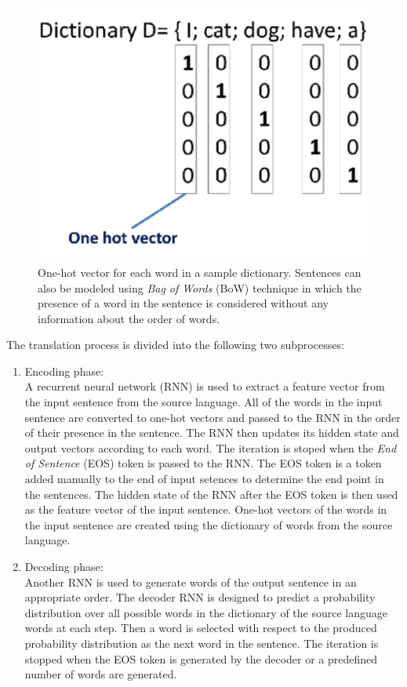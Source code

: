 \documentclass[preprint, 12pt]{elsarticle}
\begin{document}
		\begin{figure}[h]
			\centering
			\includegraphics[scale=0.5]{Imgs/onehot.png}
			\caption{One-hot vector for each word in a sample dictionary. Sentences can also be modeled using \textit{Bag of Words} (BoW) technique in which the presence of a word in the sentence is considered without any information about the order of words.}
			\label{fig:onehot}
		\end{figure}
		
		The translation process is divided into the following two subprocesses:
		\begin{enumerate}
			\item Encoding phase: \\
			A recurrent neural network (RNN) is used to extract a feature vector from the input sentence from the source language. All of the words in the input sentence are converted to one-hot vectors and passed to the RNN in the order of their presence in the sentence. The RNN then updates its hidden state and output vectors according to each word. The iteration is stoped when the \textit{End of Sentence} (EOS) token is passed to the RNN. The EOS token is a token added manually to the end of input setences to determine the end point in the sentences. The hidden state of the RNN after the EOS token is then used as the feature vector of the input sentence. One-hot vectors of the words in the input sentence are created using the dictionary of words from the source language.
			\item Decoding phase: \\
			Another RNN is used to generate words of the output sentence in an appropriate order. The decoder RNN is designed to predict a probability distribution over all possible words in the dictionary of the source language words at each step. Then a word is selected with respect to the produced probability distribution as the next word in the sentence. The iteration is stopped when the EOS token is generated by the decoder or a predefined number of words are generated.
		\end{enumerate}
		
\end{document}
